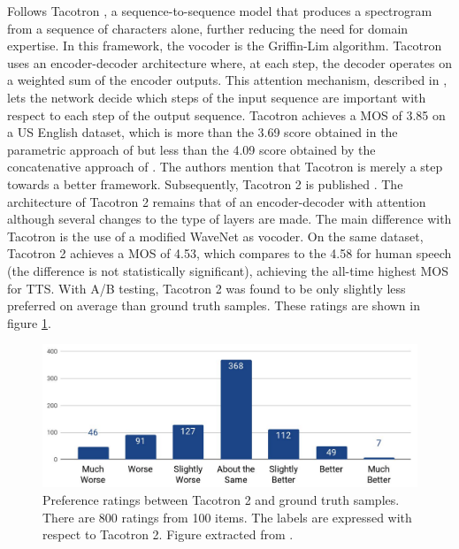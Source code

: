 \documentclass[a4paper, oneside, 12pt, english]{article}
\begin{document}

Follows Tacotron \citep{Tacotron1}, a sequence-to-sequence model that produces a spectrogram from a sequence of characters alone, further reducing the need for domain expertise. In this framework, the vocoder is the Griffin-Lim algorithm. Tacotron uses an encoder-decoder architecture where, at each step, the decoder operates on a weighted sum of the encoder outputs. This attention mechanism, described in \citep{Attention}, lets the network decide which steps of the input sequence are important with respect to each step of the output sequence. Tacotron achieves a MOS of 3.85 on a US English dataset, which is more than the 3.69 score obtained in the parametric approach of \citep{LSTM-RNN} but less than the 4.09 score obtained by the concatenative approach of \citep{ConcatenativeGoogle}. The authors mention that Tacotron is merely a step towards a better framework. Subsequently, Tacotron 2 is published \citep{Tacotron2}. The architecture of Tacotron 2 remains that of an encoder-decoder with attention although several changes to the type of layers are made. The main difference with Tacotron is the use of a modified WaveNet as vocoder. On the same dataset, Tacotron 2 achieves a MOS of 4.53, which compares to the 4.58 for human speech (the difference is not statistically significant), achieving the all-time highest MOS for TTS. With A/B testing, Tacotron 2 was found to be only slightly less preferred on average than ground truth samples. These ratings are shown in figure \ref{tacotron2_results}.

\begin{figure}[h]
	\centering
	\includegraphics[width=.8\linewidth]{images/tacotron2_results.png}
	\caption{Preference ratings between Tacotron 2 and ground truth samples. There are 800 ratings from 100 items. The labels are expressed with respect to Tacotron 2. Figure extracted from \citep{Tacotron2}.}
	\label{tacotron2_results}
\end{figure}
\end{document}
